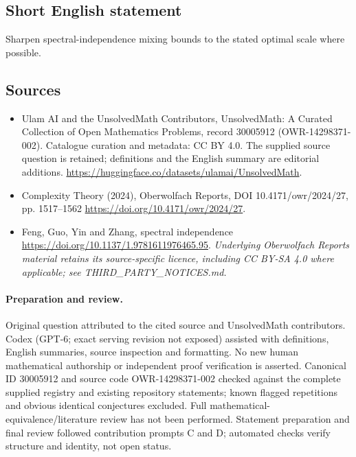 \documentclass[11pt]{article}
\begin{document}
\subsection{Short English statement}
Sharpen spectral-independence mixing bounds to the stated optimal scale where possible.
\subsection{Sources}
\begin{itemize}
\item[\hypertarget{source:30005912:1}{S1}] Ulam AI and the UnsolvedMath Contributors, UnsolvedMath: A Curated Collection of Open Mathematics Problems, record 30005912 (OWR-14298371-002). Catalogue curation and metadata: CC BY 4.0. The supplied source question is retained; definitions and the English summary are editorial additions.
\url{https://huggingface.co/datasets/ulamai/UnsolvedMath}.
\item[\hypertarget{source:30005912:2}{S2}] Complexity Theory (2024), Oberwolfach Reports, DOI 10.4171/owr/2024/27, pp. 1517--1562
\url{https://doi.org/10.4171/owr/2024/27}.
\item[\hypertarget{source:30005912:3}{S3}] Feng, Guo, Yin and Zhang, spectral independence
\url{https://doi.org/10.1137/1.9781611976465.95}.
\textit{Underlying Oberwolfach Reports material retains its source-specific licence, including CC BY-SA 4.0 where applicable; see THIRD\_PARTY\_NOTICES.md.}
\end{itemize}
\paragraph{Preparation and review.}
Original question attributed to the cited source and UnsolvedMath contributors. Codex (GPT-6; exact serving revision not exposed) assisted with definitions, English summaries, source inspection and formatting. No new human mathematical authorship or independent proof verification is asserted. Canonical ID 30005912 and source code OWR-14298371-002 checked against the complete supplied registry and existing repository statements; known flagged repetitions and obvious identical conjectures excluded. Full mathematical-equivalence/literature review has not been performed. Statement preparation and final review followed contribution prompts C and D; automated checks verify structure and identity, not open status.
\label{end:30005912}
\end{document}
